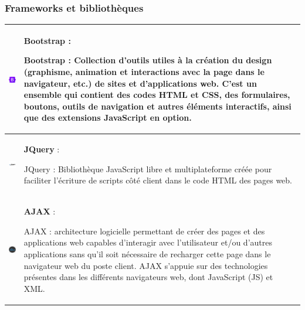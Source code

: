 \documentclass{article}
\begin{document}
            \subsubsection{Frameworks et bibliothèques}
            
            \begin{tabular}{|m{2cm}|m{12cm}|}
                \hline
                \includegraphics[width=2cm]{assets/logos/OIP (1).jpg} &
                \textbf{Bootstrap} :
                
                Bootstrap : Collection d'outils utiles à la création du design (graphisme, animation et interactions avec la page dans le navigateur, etc.) de sites et d'applications web. C'est un ensemble qui contient des codes HTML et CSS, des formulaires, boutons, outils de navigation et autres éléments interactifs, ainsi que des extensions JavaScript en option. \\
                \hline
                \includegraphics[width=2cm]{assets/logos/jq.png} &
                \textbf{JQuery} :
                
                JQuery : Bibliothèque JavaScript libre et multiplateforme créée pour faciliter l'écriture de scripts côté client dans le code HTML des pages web. \\
                \hline
                \includegraphics[width=2cm]{assets/logos/ajax.png} &
                \textbf{AJAX} :
                
                AJAX : architecture logicielle permettant de créer des pages et des applications web capables d'interagir avec l'utilisateur et/ou d'autres applications sans qu'il soit nécessaire de recharger cette page dans le navigateur web du poste client. AJAX s'appuie sur des technologies présentes dans les différents navigateurs web, dont JavaScript (JS) et XML. \\
                \hline
            \end{tabular}
        
\end{document}
